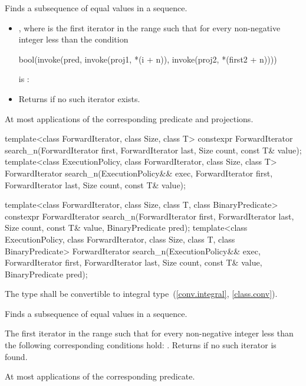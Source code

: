 \begin{itemdescr}
\pnum
\effects
Finds a subsequence of equal values in a sequence.

\pnum
\returns
\begin{itemize}
\item {}, where  is
the first iterator in the range 
such that for every non-negative integer
less than
the condition
\begin{codeblock}
bool(invoke(pred, invoke(proj1, *(i + n)), invoke(proj2, *(first2 + n))))
\end{codeblock}
is :

\item Returns
if no such iterator exists.
\end{itemize}

\pnum
\complexity
At most
applications of the corresponding predicate and projections.
\end{itemdescr}

%
\begin{itemdecl}
template<class ForwardIterator, class Size, class T>
  constexpr ForwardIterator
    search_n(ForwardIterator first, ForwardIterator last,
             Size count, const T& value);
template<class ExecutionPolicy, class ForwardIterator, class Size, class T>
  ForwardIterator
    search_n(ExecutionPolicy&& exec,
             ForwardIterator first, ForwardIterator last,
             Size count, const T& value);

template<class ForwardIterator, class Size, class T,
         class BinaryPredicate>
  constexpr ForwardIterator
    search_n(ForwardIterator first, ForwardIterator last,
             Size count, const T& value,
             BinaryPredicate pred);
template<class ExecutionPolicy, class ForwardIterator, class Size, class T,
         class BinaryPredicate>
  ForwardIterator
    search_n(ExecutionPolicy&& exec,
             ForwardIterator first, ForwardIterator last,
             Size count, const T& value,
             BinaryPredicate pred);
\end{itemdecl}

\begin{itemdescr}
\pnum
\requires
The type
shall be convertible to integral type~(\ref{conv.integral}, \ref{class.conv}).

\pnum
\effects
Finds a subsequence of equal values in a sequence.

\pnum
\returns
The first iterator
in the range 
such that for every non-negative integer
less than
the following corresponding conditions hold:
.
Returns 
if no such iterator is found.

\pnum
\complexity
At most
applications of the corresponding predicate.
\end{itemdescr}

